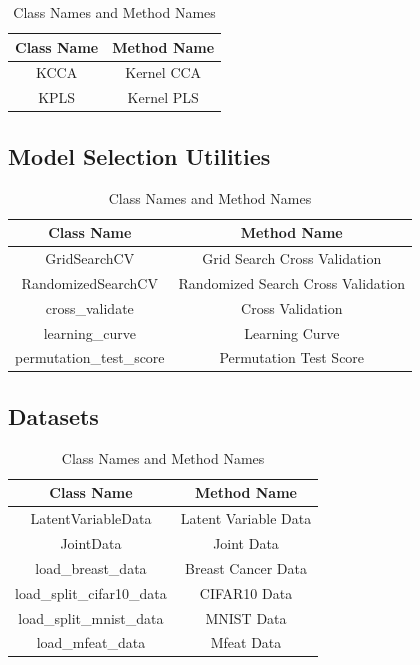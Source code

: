 \begin{table}[ht]
    \centering
    \begin{tabular}{|c|c|}
        \hline
        Class Name & Method Name \\
        \hline
        KCCA & Kernel CCA \\
        KPLS & Kernel PLS \\
        \hline
    \end{tabular}
    \caption{Class Names and Method Names}\label{tab:class_method_4}
\end{table}

\subsection{Model Selection Utilities}

\begin{table}[ht]
    \centering
    \begin{tabular}{|c|c|}
        \hline
        Class Name & Method Name \\
        \hline
        GridSearchCV & Grid Search Cross Validation \\
        RandomizedSearchCV & Randomized Search Cross Validation \\
        cross\_validate & Cross Validation \\
        learning\_curve & Learning Curve \\
        permutation\_test\_score & Permutation Test Score \\
        \hline
    \end{tabular}
    \caption{Class Names and Method Names}\label{tab:class_method_5}
\end{table}

\subsection{Datasets}

\begin{table}[ht]
    \centering
    \begin{tabular}{|c|c|}
        \hline
        Class Name & Method Name \\
        \hline
        LatentVariableData & Latent Variable Data \\
        JointData & Joint Data \\
        load\_breast\_data & Breast Cancer Data \\
        load\_split\_cifar10\_data & CIFAR10 Data \\
        load\_split\_mnist\_data & MNIST Data \\
        load\_mfeat\_data & Mfeat Data \\
        \hline
    \end{tabular}
    \caption{Class Names and Method Names}\label{tab:class_method_6}
\end{table}

